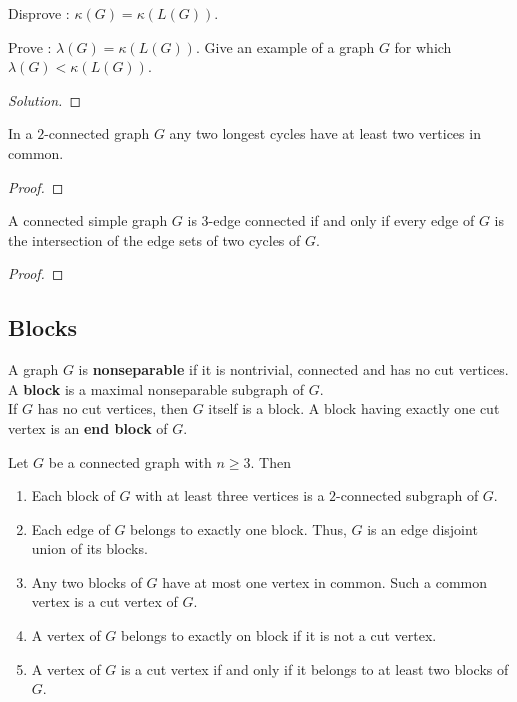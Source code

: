 \begin{exercise}
	\begin{enumerate*}
		\item Disprove : $\kappa(G) = \kappa(L(G))$.
		\item Prove : $\lambda(G) = \kappa(L(G))$. Give an example of a graph $G$ for which $\lambda(G) < \kappa(L(G))$.
	\end{enumerate*}
\end{exercise}
\begin{proof}[Solution]
\end{proof}

\begin{theorem}
	In a $2$-connected graph $G$ any two longest cycles have at least two vertices in common.
\end{theorem}
\begin{proof}
\end{proof}

\begin{theorem}
	A connected simple graph $G$ is $3$-edge connected if and only if every edge of $G$ is the intersection of the edge sets of two cycles of $G$.
\end{theorem}
\begin{proof}
\end{proof}

\subsection{Blocks}
\begin{definition}
	A graph $G$ is \textbf{nonseparable} if it is nontrivial, connected and has no cut vertices. A \textbf{block} is a maximal nonseparable subgraph of $G$.\\

	If $G$ has no cut vertices, then $G$ itself is a block. A block having exactly one cut vertex is an \textbf{end block} of $G$.
\end{definition}

\begin{remark}
Let $G$ be a connected graph with $n \ge 3$. Then
\begin{enumerate}
	\item Each block of $G$ with at least three vertices is a $2$-connected subgraph of $G$.
	\item Each edge of $G$ belongs to exactly one block. Thus, $G$ is an edge disjoint union of its blocks.
	\item Any two blocks of $G$ have at most one vertex in common. Such a common vertex is a cut vertex of $G$.
	\item A vertex of $G$ belongs to exactly on block if it is not a cut vertex.
	\item A vertex of $G$ is a cut vertex if and only if it belongs to at least two blocks of $G$.
\end{enumerate}
\end{remark}

